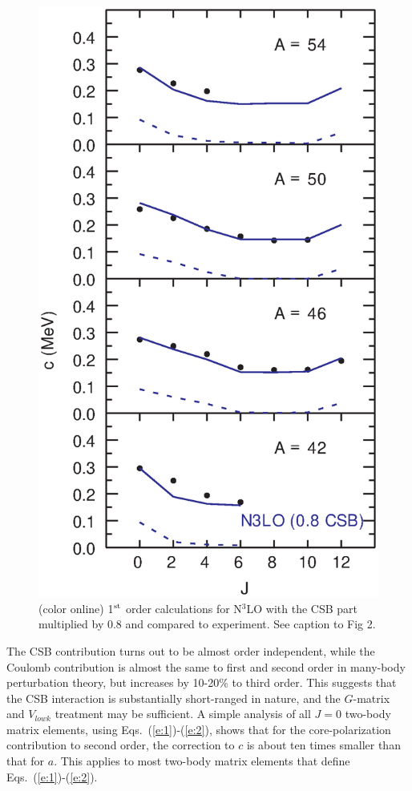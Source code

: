 \documentclass[10pt,showpacs,preprintnumbers,footinbib,amsmath,amssymb,aps,prl,twocolumn,groupedaddress,superscriptaddress,showkeys]{revtex4-1}
\begin{document}
\begin{figure}
\includegraphics[scale=0.35]{c1e.eps}
\caption{(color online) 1$^{\rm st}$ order calculations for N$^3$LO
with the CSB part multiplied by 0.8 and compared to
experiment. See caption to Fig 2.}
\end{figure}



The CSB contribution turns out to be almost order independent, while
the Coulomb contribution is almost the same to first and
second order in many-body perturbation theory, but increases by 10-20\% to third
order. This suggests that the CSB interaction is substantially
short-ranged in nature, and the $G$-matrix and $V_{lowk}$ treatment
may be sufficient. A simple analysis of all $J=0$ two-body matrix elements, using
Eqs.~(\ref{e:1})-(\ref{e:2}), shows that for the core-polarization contribution to second order, the 
correction to $c$ is about ten times smaller than that for $a$. This applies to most two-body matrix elements 
that define Eqs.~(\ref{e:1})-(\ref{e:2}).
\end{document}
